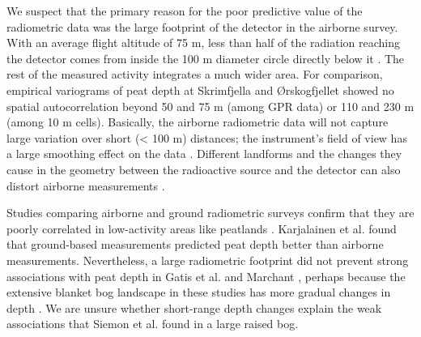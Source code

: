 \documentclass[soil, manuscript]{copernicus}
\begin{document}
We suspect that the primary reason for the poor predictive value of the radiometric data was the large footprint of the detector in the airborne survey.
With an average flight altitude of 75 m, less than half of the radiation reaching the detector comes from inside the 100 m diameter circle directly below it \citep{beamishEnhancingResolutionAirborne2016, beamishDetailedMappingPeat2024}.
The rest of the measured activity integrates a much wider area.
For comparison, empirical variograms of peat depth at Skrimfjella and Ørskogfjellet showed no spatial autocorrelation beyond 50 and 75 m (among GPR data) or 110 and 230 m (among 10 m cells).
Basically, the airborne radiometric data will not capture large variation over short (\textless{} 100 m) distances; the instrument's field of view has a large smoothing effect on the data \citep{beamishEnhancingResolutionAirborne2016, reinhardtGammaraySpectrometryVersatile2019}.
Different landforms and the changes they cause in the geometry between the radioactive source and the detector can also distort airborne measurements \citep{reinhardtGammaraySpectrometryVersatile2019}.

Studies comparing airborne and ground radiometric surveys confirm that they are poorly correlated in low-activity areas like peatlands \citep{kockComparisonAirborneTerrestrial2011, karjalainenComparisonTwoGammaray2025}.
Karjalainen et al. \citeyearpar{karjalainenComparisonTwoGammaray2025} found that ground-based measurements predicted peat depth better than airborne measurements.
Nevertheless, a large radiometric footprint did not prevent strong associations with peat depth in Gatis et al. \citeyearpar{gatisMappingUplandPeat2019} and Marchant \citeyearpar{marchantUsingRemoteSensors2021}, perhaps because the extensive blanket bog landscape in these studies has more gradual changes in depth \citep{lindsayBogsEcologyClassification1995}.
We are unsure whether short-range depth changes explain the weak associations that Siemon et al. \citeyearpar{siemonAirborneElectromagneticRadiometric2020} found in a large raised bog.
\end{document}
